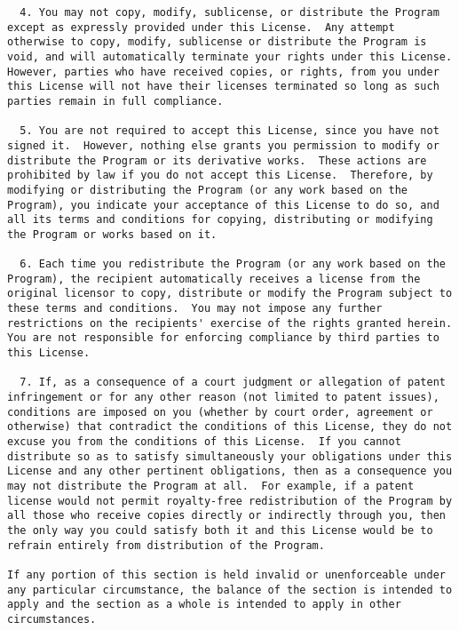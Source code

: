 \documentclass{article}
\begin{document}
\begin{appendix}
\begin{verbatim}
  4. You may not copy, modify, sublicense, or distribute the Program
except as expressly provided under this License.  Any attempt
otherwise to copy, modify, sublicense or distribute the Program is
void, and will automatically terminate your rights under this License.
However, parties who have received copies, or rights, from you under
this License will not have their licenses terminated so long as such
parties remain in full compliance.

  5. You are not required to accept this License, since you have not
signed it.  However, nothing else grants you permission to modify or
distribute the Program or its derivative works.  These actions are
prohibited by law if you do not accept this License.  Therefore, by
modifying or distributing the Program (or any work based on the
Program), you indicate your acceptance of this License to do so, and
all its terms and conditions for copying, distributing or modifying
the Program or works based on it.

  6. Each time you redistribute the Program (or any work based on the
Program), the recipient automatically receives a license from the
original licensor to copy, distribute or modify the Program subject to
these terms and conditions.  You may not impose any further
restrictions on the recipients' exercise of the rights granted herein.
You are not responsible for enforcing compliance by third parties to
this License.

  7. If, as a consequence of a court judgment or allegation of patent
infringement or for any other reason (not limited to patent issues),
conditions are imposed on you (whether by court order, agreement or
otherwise) that contradict the conditions of this License, they do not
excuse you from the conditions of this License.  If you cannot
distribute so as to satisfy simultaneously your obligations under this
License and any other pertinent obligations, then as a consequence you
may not distribute the Program at all.  For example, if a patent
license would not permit royalty-free redistribution of the Program by
all those who receive copies directly or indirectly through you, then
the only way you could satisfy both it and this License would be to
refrain entirely from distribution of the Program.

If any portion of this section is held invalid or unenforceable under
any particular circumstance, the balance of the section is intended to
apply and the section as a whole is intended to apply in other
circumstances.


\end{verbatim}
\end{appendix}
\end{document}
